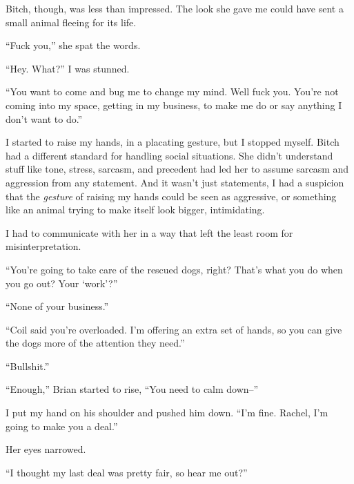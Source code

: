 Bitch, though, was less than impressed.  The look she gave me could have sent a small animal fleeing for its life.



``Fuck you,'' she spat the words.



``Hey.  What?'' I was stunned.



``You want to come and bug me to change my mind.  Well fuck you.  You're not coming into my space, getting in my business, to make me do or say anything I don't want to do.''



I started to raise my hands, in a placating gesture, but I stopped myself.  Bitch had a different standard for handling social situations.  She didn't understand stuff like tone, stress, sarcasm, and precedent had led her to assume sarcasm and aggression from any statement.  And it wasn't just statements, I had a suspicion that the \emph{gesture} of raising my hands could be seen as aggressive, or something like an animal trying to make itself look bigger, intimidating.



I had to communicate with her in a way that left the least room for misinterpretation.



``You're going to take care of the rescued dogs, right?  That's what you do when you go out?  Your `work'?''



``None of your business.''



``Coil said you're overloaded.  I'm offering an extra set of hands, so you can give the dogs more of the attention they need.''



``Bullshit.''



``Enough,'' Brian started to rise, ``You need to calm down--''



I put my hand on his shoulder and pushed him down.  ``I'm fine.  Rachel, I'm going to make you a deal.''



Her eyes narrowed.



``I thought my last deal was pretty fair, so hear me out?''



